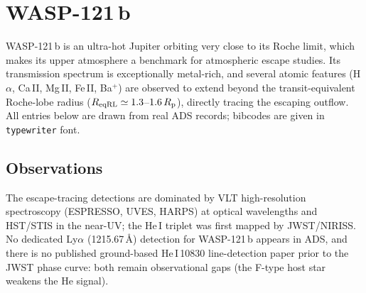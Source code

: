 \section{WASP-121\,b}
\label{sec:wasp121}

WASP-121\,b is an ultra-hot Jupiter orbiting very close to its Roche limit,
which makes its upper atmosphere a benchmark for atmospheric escape studies.
Its transmission spectrum is exceptionally metal-rich, and several atomic
features (H$\alpha$, Ca\,II, Mg\,II, Fe\,II, Ba$^{+}$) are observed to extend
beyond the transit-equivalent Roche-lobe radius ($R_{\rm eqRL}\simeq
1.3$--$1.6\,R_{\rm p}$), directly tracing the escaping outflow. All entries
below are drawn from real ADS records; bibcodes are given in
\texttt{typewriter} font.

\subsection{Observations}

The escape-tracing detections are dominated by VLT high-resolution
spectroscopy (ESPRESSO, UVES, HARPS) at optical wavelengths and HST/STIS in
the near-UV; the He\,I triplet was first mapped by JWST/NIRISS. No dedicated
Ly$\alpha$ (1215.67\,\AA) detection for WASP-121\,b appears in ADS, and there
is no published ground-based He\,I\,10830 line-detection paper prior to the
JWST phase curve: both remain observational gaps (the F-type host star
weakens the He signal).

